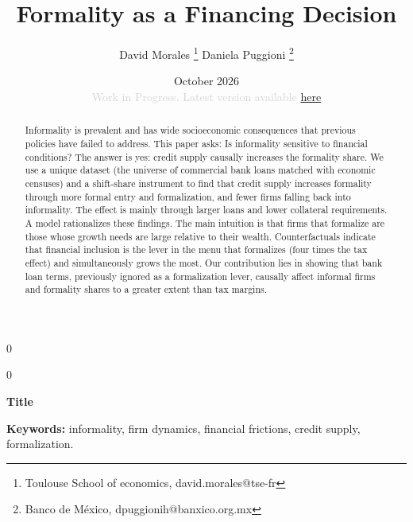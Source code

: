 \documentclass[12pt]{article}
\newcommand{\blind}{0}
\begin{document}
\def\spacingset#1{\renewcommand{\baselinestretch}
{#1}\small\normalsize} \spacingset{1}



\blind
{
    \title{\bf Formality as a Financing Decision}
  \author{David Morales \thanks{Toulouse School of economics, david.morales@tse-fr} \quad Daniela Puggioni \thanks{Banco de México, dpuggionih@banxico.org.mx}}
  \date{October 2026 \\
  \vspace{3mm}
  \textcolor{lightgray}{Work in Progress. Latest version available
    \href{https://davidsmorales.github.io/files/FinancialFrictions.pdf}{here}%
  }%
}
\maketitle
} \fi

\blind
{
  \bigskip
  \bigskip
  \bigskip
  \begin{center}
    {\LARGE\bf Title}
\end{center}
  \medskip
} \fi

\bigskip

\begin{abstract}
Informality is prevalent and has wide socioeconomic consequences that previous policies have failed to address. This paper asks: Is informality sensitive to financial conditions? The answer is yes: credit supply causally increases the formality share. We use a unique dataset (the universe of commercial bank loans matched with economic censuses) and a shift-share instrument to find that credit supply increases formality through more formal entry and formalization, and fewer firms falling back into informality. The effect is mainly through larger loans and lower collateral requirements. A model rationalizes these findings. The main intuition is that firms that formalize are those whose growth needs are large relative to their wealth. Counterfactuals indicate that financial inclusion is the lever in the menu that formalizes (four times the tax effect) and simultaneously grows the most. Our contribution lies in showing that bank loan terms, previously ignored as a formalization lever, causally affect informal firms and formality shares to a greater extent than tax margins.
\end{abstract}

\noindent\textbf{Keywords:} informality, firm dynamics, financial frictions, credit supply, formalization.
\vfill
\end{document}
